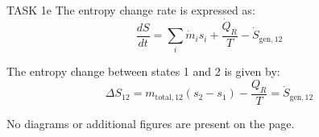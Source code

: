 TASK 1e  
The entropy change rate is expressed as:  
\[
\frac{dS}{dt} = \sum_i \dot{m}_i s_i + \frac{\dot{Q}_R}{T} - \dot{S}_{\text{gen},12}
\]  

The entropy change between states 1 and 2 is given by:  
\[
\Delta S_{12} = m_{\text{total},12} (s_2 - s_1) - \frac{Q_R}{T} = \dot{S}_{\text{gen},12}
\]  

No diagrams or additional figures are present on the page.
